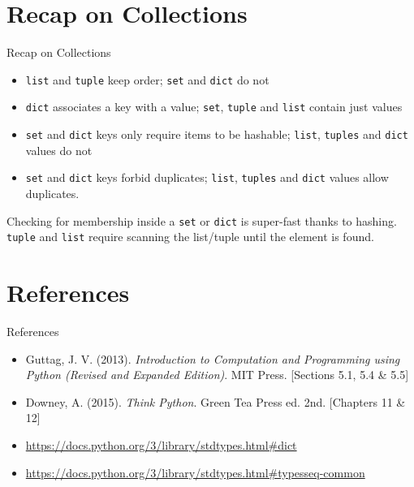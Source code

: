 \documentclass[t,handout,9pt]{beamer}
\begin{document}
\section{Recap on Collections}
\begin{frame}{Recap on Collections}
\vfill
\begin{itemize}
	\item \texttt{list} and \texttt{tuple} keep order; \texttt{set} and \texttt{dict} do not
	\item \texttt{dict} associates a key with a value; \texttt{set}, \texttt{tuple} and \texttt{list} contain just values
	\item \texttt{set} and \texttt{dict} keys only require items to be hashable; \texttt{list}, \texttt{tuples} and \texttt{dict} values do not
	\item \texttt{set} and \texttt{dict} keys forbid duplicates; \texttt{list}, \texttt{tuples} and \texttt{dict} values allow duplicates.
\end{itemize}
\vfill
Checking for membership inside a \texttt{set} or \texttt{dict} is super-fast thanks to hashing.\\
\texttt{tuple} and \texttt{list} require scanning the list/tuple until the element is found.
\vfill
\end{frame}
\section{References}
\begin{frame}{References}
\begin{itemize}
	\item Guttag, J. V. (2013). \textit{Introduction to Computation and Programming using Python (Revised and Expanded Edition)}. MIT Press. [Sections 5.1, 5.4 \& 5.5]
	\item Downey, A. (2015). \textit{Think Python}. Green Tea Press ed. 2nd. [Chapters 11 \& 12]
	\item \url{https://docs.python.org/3/library/stdtypes.html\#dict}
	\item \url{https://docs.python.org/3/library/stdtypes.html\#typesseq-common}
\end{itemize}
\end{frame}
\end{document}
